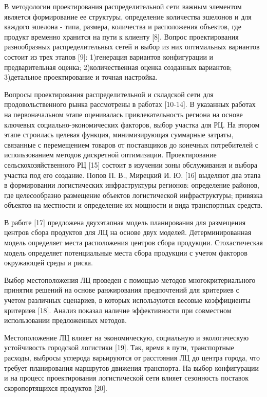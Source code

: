 В методологии проектирования распределительной сети важным элементом
является формирование ее структуры, определение количества эшелонов и
для каждого эшелона - типа, размера, количества и расположения объектов,
где продукт временно хранится на пути к клиенту {[}8{]}. Вопрос
проектирования разнообразных распределительных сетей и выбор из них
оптимальных вариантов состоит из трех этапов {[}9{]}: 1)генерация
вариантов конфигурации и предварительная оценка; 2)количественная оценка
созданных вариантов; 3)детальное проектирование и точная настройка.

Вопросы проектирования распределительной и складской сети для
продовольственного рынка рассмотрены в работах {[}10-14{]}. В указанных
работах на первоначальном этапе оценивалась привлекательность региона на
основе ключевых социально-экономических факторов, выбор участка для РЦ.
На втором этапе строилась целевая функция, минимизирующая суммарные
затраты, связанные с перемещением товаров от поставщиков до конечных
потребителей с использованием методов дискретной оптимизации.
Проектирование сельскохозяйственного РЦ {[}15{]} состоит в изучении зоны
обслуживания и выбора участка под его создание. Попов П. В., Мирецкий И.
Ю. {[}16{]} выделяют два этапа в формировании логистических
инфраструктуры регионов: определение районов, где целесообразно
размещение объектов логистической инфраструктуры; привязка объектов на
местности и определение их мощности и вида транспортных средств.

В работе {[}17{]} предложена двухэтапная модель планирования для
размещения центров сбора продуктов для ЛЦ на основе двух моделей.
Детерминированная модель определяет места расположения центров сбора
продукции. Стохастическая модель определяет потенциальные места сбора
продукции с учетом факторов окружающей среды и риска.

Выбор местоположения ЛЦ проведен с помощью методов многокритериального
принятия решений на основе ранжирования предпочтений для критериев с
учетом различных сценариев, в которых используются весовые коэффициенты
критериев {[}18{]}. Анализ показал наличие эффективности при совместном
использовании предложенных методов.

Местоположение ЛЦ влияет на экономическую, социальную и экологическую
устойчивость городской логистики {[}19{]}. Так, время в пути,
транспортные расходы, выбросы углерода варьируются от расстояния ЛЦ до
центра города, что требует планирования маршрутов движения транспорта.
На выбор конфигурации и на процесс проектирования логистической сети
влияет сезонность поставок скоропортящихся продуктов {[}20{]}.

